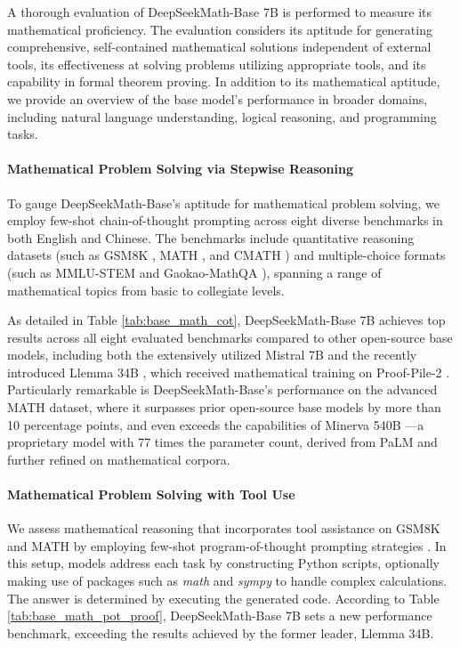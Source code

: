 A thorough evaluation of DeepSeekMath-Base 7B is performed to measure its mathematical proficiency. The evaluation considers its aptitude for generating comprehensive, self-contained mathematical solutions independent of external tools, its effectiveness at solving problems utilizing appropriate tools, and its capability in formal theorem proving. In addition to its mathematical aptitude, we provide an overview of the base model’s performance in broader domains, including natural language understanding, logical reasoning, and programming tasks.

\paragraph{Mathematical Problem Solving via Stepwise Reasoning}

To gauge DeepSeekMath-Base's aptitude for mathematical problem solving, we employ few-shot chain-of-thought prompting \citep{cot} across eight diverse benchmarks in both English and Chinese. The benchmarks include quantitative reasoning datasets (such as GSM8K \citep{gsm8k}, MATH \citep{MATH}, and CMATH \citep{wei2023cmath}) and multiple-choice formats (such as MMLU-STEM \citep{mmlu} and Gaokao-MathQA \citep{agieval}), spanning a range of mathematical topics from basic to collegiate levels.

As detailed in Table \ref{tab:base_math_cot}, DeepSeekMath-Base 7B achieves top results across all eight evaluated benchmarks compared to other open-source base models, including both the extensively utilized Mistral 7B \citep{mistral} and the recently introduced Llemma 34B \citep{llemma}, which received mathematical training on Proof-Pile-2 \citep{llemma}. Particularly remarkable is DeepSeekMath-Base’s performance on the advanced MATH dataset, where it surpasses prior open-source base models by more than 10 percentage points, and even exceeds the capabilities of Minerva 540B \citep{minerva}—a proprietary model with 77 times the parameter count, derived from PaLM \citep{palm} and further refined on mathematical corpora.

\paragraph{Mathematical Problem Solving with Tool Use} We assess mathematical reasoning that incorporates tool assistance on GSM8K and MATH by employing few-shot program-of-thought prompting strategies \citep{pot,pal}. In this setup, models address each task by constructing Python scripts, optionally making use of packages such as \textit{math} and \textit{sympy} to handle complex calculations. The answer is determined by executing the generated code. According to Table \ref{tab:base_math_pot_proof}, DeepSeekMath-Base 7B sets a new performance benchmark, exceeding the results achieved by the former leader, Llemma 34B.

